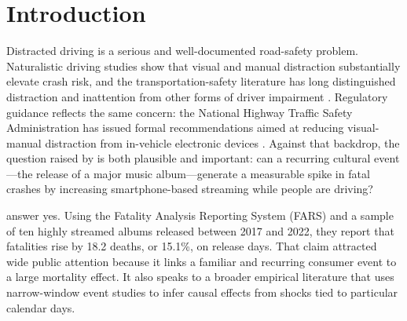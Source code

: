 \documentclass[11pt]{article}
\begin{document}
\begin{abstract}
\begin{singlespace}
The mechanism remains untested. The comparison of crashes with and without an impaired driver now
covers all ten albums, using NHTSA's multiply imputed blood alcohol files rather than the
\texttt{DRUNK\_DR} field that leaves the crash record after 2020, but it splits on an outcome and
so identifies nothing. The alternative that would most threaten the causal reading, that a busy
week generates both more streaming and more driving, is testable once the streaming series is in
hand, and it fails: ambient listening, the daily US chart total with that day's new releases
removed, does not predict fatalities at all, and adding it moves the estimate by two hundredths of
a death. The anomaly is real, it is not a day-of-week artifact, and it is not ambient activity. It
is a property of those ten albums rather than of releases their size.
\end{singlespace}
\end{abstract}


\section{Introduction}
\label{sec:intro}

Distracted driving is a serious and well-documented road-safety problem. Naturalistic driving studies show that visual and manual distraction substantially elevate crash risk, and the transportation-safety literature has long distinguished distraction and inattention from other forms of driver impairment \citep{klauer2006impact,regan2011driver,dingus2016crash}. Regulatory guidance reflects the same concern: the National Highway Traffic Safety Administration has issued formal recommendations aimed at reducing visual-manual distraction from in-vehicle electronic devices \citep{nhtsa2013visual}. Against that backdrop, the question raised by \citet{patel2026smartphones} is both plausible and important: can a recurring cultural event---the release of a major music album---generate a measurable spike in fatal crashes by increasing smartphone-based streaming while people are driving?

\citet{patel2026smartphones} answer yes. Using the Fatality Analysis Reporting System (FARS) and a sample of ten highly streamed albums released between 2017 and 2022, they report that fatalities rise by 18.2 deaths, or 15.1\%, on release days. That claim attracted wide public attention because it links a familiar and recurring consumer event to a large mortality effect. It also speaks to a broader empirical literature that uses narrow-window event studies to infer causal effects from shocks tied to particular calendar days.
\end{document}
